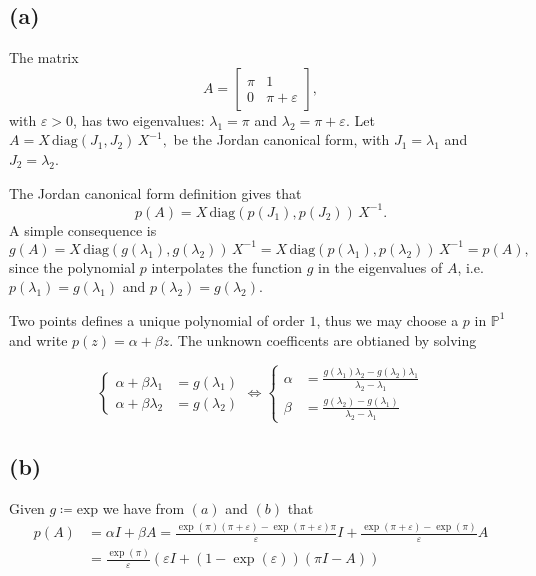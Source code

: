 \subsection*{(a)}
The matrix
\begin{equation}
  A = \begin{bmatrix}
    \pi & 1 \\
    0 & \pi + \varepsilon
  \end{bmatrix},
\end{equation}
with $\varepsilon > 0$, has two eigenvalues: $\lambda_{1} = \pi$ and $\lambda_{2} = \pi+\varepsilon$. Let $A = X\, \text{diag}(J_{1},J_{2})\,X^{-1},$ be the Jordan canonical form, with $J_{1} = \lambda_{1}$ and $J_{2} = \lambda_{2}$.

The Jordan canonical form definition gives that
\begin{equation}
  p(A) = X\, \text{diag}(p(J_{1}),p(J_{2}))\,X^{-1}.
\end{equation}
 A simple consequence is
\begin{equation}
  g(A) = X\, \text{diag}(g(\lambda_{1}),g(\lambda_{2}))\,X^{-1} = X\, \text{diag}(p(\lambda_{1}),p(\lambda_{2}))\,X^{-1} = p(A),
\end{equation}
since the polynomial $p$ interpolates the function $g$ in the eigenvalues of $A$, i.e. $p(\lambda_{1}) = g(\lambda_{1})$ and $p(\lambda_{2}) = g(\lambda_{2})$.

Two points defines a unique polynomial of order $1$, thus we may choose a $p$ in $\mathbb{P}^{1}$ and write $p(z) = \alpha + \beta z$. The unknown coefficents are obtianed by solving

\begin{equation}
  \begin{cases}
    \alpha + \beta \lambda_{1} &= g(\lambda_{1})\\
    \alpha + \beta \lambda_{2} &= g(\lambda_{2})
  \end{cases}
  \Leftrightarrow
   \begin{cases}
    \alpha  &= \frac{g(\lambda_{1})\lambda_{2}-g(\lambda_{2})\lambda_{1}}{\lambda_{2}-\lambda_{1}}\\
    \beta  &= \frac{g(\lambda_{2})-g(\lambda_{1})}{\lambda_{2}-\lambda_{1}}
  \end{cases}
\end{equation}


\subsection*{(b)}
Given $g\coloneqq \text{exp}$ we have from $(a)$ and $(b)$ that
\begin{align}
  \label{eq:task6exp}
  p(A)  &= \alpha I + \beta A = \frac{\exp{(\pi)}(\pi + \varepsilon)-\exp{(\pi + \varepsilon)}\pi}{\varepsilon} I + \frac{\exp{(\pi + \varepsilon)}-\exp{(\pi)}}{\varepsilon}A \\
  &= \frac{\exp(\pi)}{\varepsilon}(\varepsilon I+(1 - \exp{(\varepsilon)})(\pi I -A))
\end{align}
